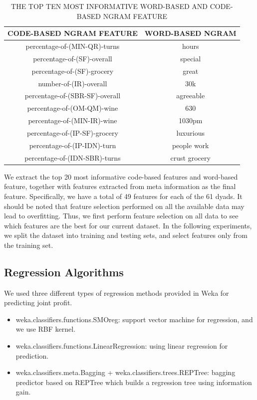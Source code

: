 \documentclass[11pt]{article} %
\begin{document}
\begin{table}
  \centering
  \caption{THE TOP TEN MOST INFORMATIVE WORD-BASED AND CODE-BASED NGRAM FEATURE}
  \begin{tabular}{|c|c|}
     \hline
CODE-BASED NGRAM FEATURE & WORD-BASED NGRAM \\
  \hline
percentage-of-(MIN-QR)-turns & hours \\

percentage-of-(SF)-overall & special\\

percentage-of-(SF)-grocery & great\\

number-of-(IR)-overall & 30k\\

percentage-of-(SBR-SF)-overall & agreeable\\

percentage-of-(OM-QM)-wine & 630\\

percentage-of-(MIN-IR)-wine & 1030pm\\

percentage-of-(IP-SF)-grocery & luxurious\\

percentage-of-(IP-IDN)-turn & people work\\

percentage-of-(IDN-SBR)-turns & crust grocery\\
  \hline
  \end{tabular}\label{tab:selected_ngram}
\end{table}

We extract the top 20 most informative code-based features and word-based feature, together with features extracted from meta information as the final feature. Specifically, we have a total of 49 features for each of the 61 dyads. It should be noted that feature selection performed on all the available data may lead to overfitting.  Thus, we first perform feature selection on all data to see which features are the best for our current dataset. In the following experiments, we split the dataset into training and testing sets, and select features only from the training set.

\subsection{Regression Algorithms}
We used three different types of regression methods provided in Weka for predicting joint profit.
\begin{itemize}
\item weka.classifiers.functions.SMOreg: support vector machine for regression, and we use RBF kernel. \cite{SVM} \cite{SMO}
\item weka.classifiers.functions.LinearRegression: using linear regression for prediction.
\item weka.classifiers.meta.Bagging + weka.classifiers.trees.REPTree: bagging predictor based on REPTree which builds a regression tree using information gain. \cite{bagging}
\end{itemize}
\end{document}
